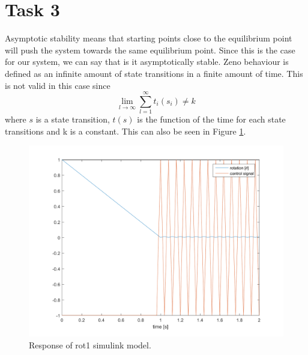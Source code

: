 \documentclass[a4paper,12pt,oneside,onecolumn]{article} %
\begin{document}
\section*{Task 3}
        Asymptotic stability means that starting points close to the
        equilibrium point will push the system towards the same equilibrium point.
        Since this is the case for our system, we can say that is it
        asymptotically stable.
	Zeno behaviour is defined as an infinite amount of state
        transitions in a finite amount of time. This is not valid in
        this case since 
        \begin{equation}
          \lim_{l \to \infty}\sum\limits_{l=1}^\infty t_i(s_i) \neq k
        \end{equation}
        where $s$ is a state transition, $t(s)$ is the function of the time 
        for each state transitions and k is a constant.
        This can also be seen in Figure \ref{fig:task3_plot}.
        \begin{figure}[H]
        \centering
        \includegraphics[scale=0.5]{../matlab/images/task3_plot.png}
        \caption{Response of rot1 simulink model.}
        \label{fig:task3_plot}
    \end{figure}
\end{document}
